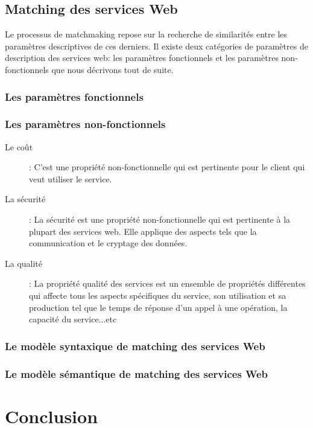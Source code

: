   \subsection{Matching des services Web}
  \label{sec:ws-matching} Le processus de matchmaking repose sur la
  recherche de similarités entre les paramètres descriptives de ces
  derniers. Il existe deux catégories de paramètres de description des
  services web: les paramètres fonctionnels et les paramètres
  non-fonctionnels que nous décrivons tout de suite.

    \subsubsection{Les paramètres fonctionnels}
    \label{sec:params-fonc}

    \subsubsection{Les paramètres non-fonctionnels}
    \label{sec:params-non-fonc}

    \SpecialItem
    \begin{description}
    \item [Le coût]: C’est une propriété non-fonctionnelle qui est
      pertinente pour le client qui veut utiliser le service.

    \item [La sécurité]: La sécurité est une propriété
      non-fonctionnelle qui est pertinente à la plupart des services
      web. Elle applique des aspects tels que la communication et le
      cryptage des données.

    \item [La qualité]: La propriété qualité des services est un
      ensemble de propriétés différentes qui affecte tous les aspects
      spécifiques du service, son utilisation et sa production tel que
      le temps de réponse d'un appel à une opération, la capacité du
      service...etc
    \end{description}

    \subsubsection{Le modèle syntaxique de matching des services Web}
    \label{sec:syntactic-matching}

    \subsubsection{Le modèle sémantique de matching des services Web}
    \label{sec:semantic-matching}

\newpage
\section{Conclusion}

